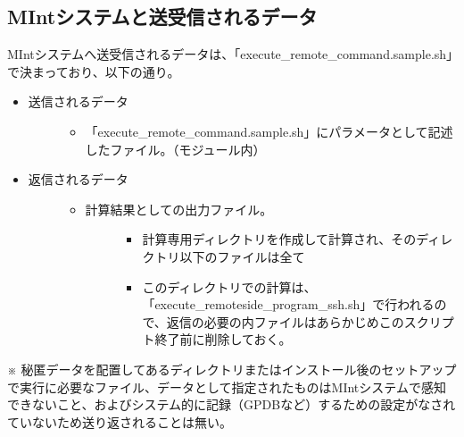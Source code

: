 \documentclass[letterpaper,10pt,dvipdfmx,openany]{sphinxmanual}
\begin{document}
\subsection{MIntシステムと送受信されるデータ}
\label{\detokenize{using_distributed_properties:id14}}
MIntシステムへ送受信されるデータは、「execute\_remote\_command.sample.sh」で決まっており、以下の通り。
\begin{itemize}
\item {} \begin{description}
\item[{送信されるデータ}] \leavevmode\begin{itemize}
\item {} 
「execute\_remote\_command.sample.sh」にパラメータとして記述したファイル。（モジュール内）

\end{itemize}

\end{description}

\item {} \begin{description}
\item[{返信されるデータ}] \leavevmode\begin{itemize}
\item {} \begin{description}
\item[{計算結果としての出力ファイル。}] \leavevmode\begin{itemize}
\item {} 
計算専用ディレクトリを作成して計算され、そのディレクトリ以下のファイルは全て

\item {} 
このディレクトリでの計算は、「execute\_remote\sphinxhyphen{}side\_program\_ssh.sh」で行われるので、返信の必要の内ファイルはあらかじめこのスクリプト終了前に削除しておく。

\end{itemize}

\end{description}

\end{itemize}

\end{description}

\end{itemize}

※ 秘匿データを配置してあるディレクトリまたはインストール後のセットアップで実行に必要なファイル、データとして指定されたものはMIntシステムで感知できないこと、およびシステム的に記録（GPDBなど）するための設定がなされていないため送り返されることは無い。
\end{document}
